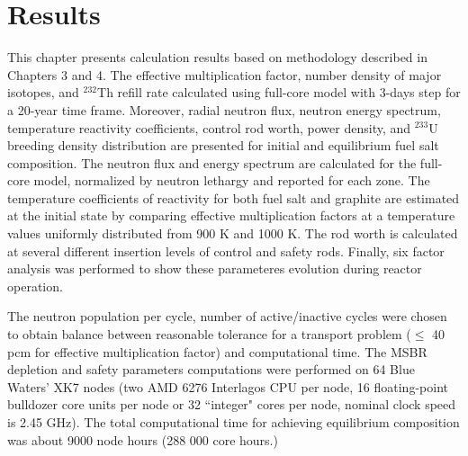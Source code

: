 \chapter[Results]{Results}

This chapter presents calculation results based on methodology described in Chapters 3 and 4. The effective multiplication factor, number density of major isotopes, and $^{232}$Th refill rate calculated using full-core model with 3-days step for a 20-year time frame. Moreover, radial neutron flux, neutron energy spectrum, temperature reactivity coefficients, control rod worth, power density, and $^{233}$U breeding density distribution are presented for initial and equilibrium fuel salt composition. The neutron flux and energy spectrum are calculated for the full-core model, normalized by neutron lethargy and reported for each zone. The temperature coefficients of reactivity for both fuel salt and graphite are estimated at the initial state by comparing effective multiplication factors at a temperature values uniformly distributed from 900 K and 1000 K. The rod worth is calculated at several different insertion levels of control and safety rods. Finally, six factor analysis was performed to show these parameteres evolution during reactor operation.

The neutron population per cycle, number of active/inactive cycles were chosen to obtain balance between reasonable tolerance for a transport problem ($\leq$ 40 pcm for effective multiplication factor) and computational time. The \gls{MSBR} depletion and safety parameters computations were performed on 64 Blue Waters' XK7 nodes (two AMD 6276 Interlagos CPU per node, 16 floating-point bulldozer core units per node or 32 ``integer" cores per node, nominal clock speed is 2.45 GHz). The total computational time for achieving equilibrium composition was about 9000 node hours (288 000 core hours.)

